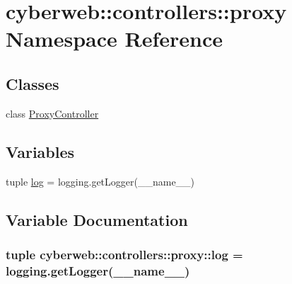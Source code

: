 \hypertarget{namespacecyberweb_1_1controllers_1_1proxy}{\section{cyberweb\-:\-:controllers\-:\-:proxy \-Namespace \-Reference}
\label{namespacecyberweb_1_1controllers_1_1proxy}
}
\subsection*{\-Classes}
\begin{DoxyCompactItemize}
\item 
class \hyperlink{classcyberweb_1_1controllers_1_1proxy_1_1_proxy_controller}{\-Proxy\-Controller}
\end{DoxyCompactItemize}
\subsection*{\-Variables}
\begin{DoxyCompactItemize}
\item 
tuple \hyperlink{namespacecyberweb_1_1controllers_1_1proxy_ad771210862e3677a9b65270293980faa}{log} = logging.\-get\-Logger(\-\_\-\-\_\-name\-\_\-\-\_\-)
\end{DoxyCompactItemize}


\subsection{\-Variable \-Documentation}
\hypertarget{namespacecyberweb_1_1controllers_1_1proxy_ad771210862e3677a9b65270293980faa}{
\subsubsection[{log}]{\setlength{\rightskip}{0pt plus 5cm}tuple {\bf cyberweb\-::controllers\-::proxy\-::log} = logging.\-get\-Logger(\-\_\-\-\_\-name\-\_\-\-\_\-)}}\label{namespacecyberweb_1_1controllers_1_1proxy_ad771210862e3677a9b65270293980faa}
